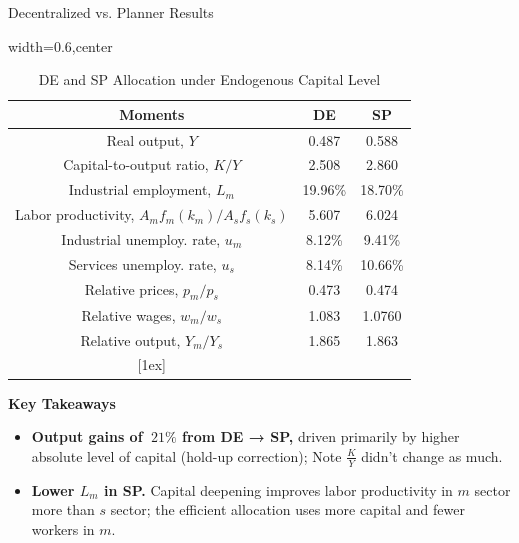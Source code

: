 \documentclass[9pt,xcolor={svgnames}]{beamer}
\begin{document}
\begin{frame}{Decentralized vs. Planner Results }

\begin{table}[H]
 \caption{DE and SP  Allocation under Endogenous Capital Level} \label{DE_SP}
\centering
\begin{adjustbox}{width=0.6\columnwidth,center}

 \begin{tabular}{||c c c||} 
 \hline
 \textbf{Moments} & \textbf{DE} & \textbf{SP} \\  
 \hline\hline
  Real output, $Y$ &  0.487   &  0.588 \\
Capital-to-output ratio, $K/Y$ & 2.508 & 2.860 \\
  Industrial employment, $L_m$ & 19.96\%  & 18.70\% \\
Labor productivity, $A_mf_m(k_m)/A_sf_s(k_s)$ & 5.607 & 6.024\\ 
  Industrial unemploy. rate, $u_m$ & 8.12\% & 9.41\%  \\ 
   Services unemploy. rate,  $u_s$ & 8.14\% & 10.66\%  \\ 
  Relative prices, $p_m/p_s$ & 0.473  &  0.474 \\
 Relative wages, $w_m/w_s$ &  1.083 & 1.0760 \\
 Relative output, $Y_m/Y_s$ & 1.865  & 1.863 \\
 [1ex] 
 \hline
 \end{tabular}
\end{adjustbox}
 
\end{table} 

\textbf{Key Takeaways}
\begin{itemize}
  \item  \textbf{Output gains of $~21\%$ from DE → SP,} driven primarily by higher absolute level of capital (hold-up correction); Note $\frac{K}{Y}$ didn't change as much. 
\medskip
         \item \textbf{Lower $L_m$ in SP.} Capital deepening improves labor productivity in $m$ sector more than $s$ sector; the efficient allocation uses more capital and fewer workers in $m$.
\end{itemize}
\end{frame}
\end{document}
